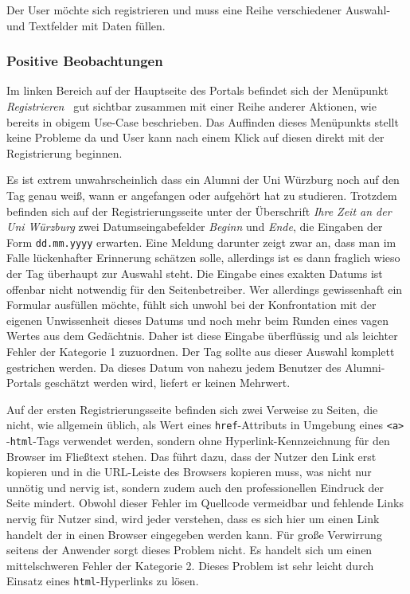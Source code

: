 \newpage
{}
Der User möchte sich registrieren und muss eine Reihe verschiedener Auswahl- und Textfelder mit Daten füllen.

\subsubsection*{Positive Beobachtungen} 
Im linken Bereich auf der Hauptseite des Portals befindet sich der Menüpunkt \emph{ Registrieren} ~gut sichtbar zusammen mit einer Reihe anderer Aktionen, wie bereits in obigem Use-Case beschrieben. Das Auffinden dieses Menüpunkts stellt keine Probleme da und User kann nach einem Klick auf diesen direkt mit der Registrierung
beginnen.




{ Es ist extrem unwahrscheinlich dass ein Alumni der Uni Würzburg noch auf den Tag genau weiß, wann er angefangen oder aufgehört hat zu studieren. Trotzdem befinden sich auf
der Registrierungsseite unter der Überschrift \emph{Ihre Zeit an der Uni Würzburg} zwei Datumseingabefelder \emph{Beginn} und \emph{Ende}, die Eingaben der Form \texttt{dd.mm.yyyy} erwarten.
}
{
Eine Meldung darunter zeigt zwar an, dass man im Falle lückenhafter Erinnerung schätzen solle, allerdings ist es dann fraglich wieso der Tag überhaupt zur Auswahl steht. Die Eingabe eines exakten Datums ist offenbar nicht notwendig für den Seitenbetreiber. Wer allerdings gewissenhaft ein Formular ausfüllen möchte, fühlt sich unwohl bei der Konfrontation mit der eigenen Unwissenheit dieses Datums und noch mehr beim Runden eines vagen Wertes aus dem Gedächtnis. Daher ist diese Eingabe überflüssig und als leichter Fehler der Kategorie 1 zuzuordnen.
}
{ Der Tag sollte aus dieser Auswahl komplett gestrichen werden. Da dieses Datum von nahezu jedem Benutzer des Alumni-Portals geschätzt werden wird, liefert er keinen Mehrwert.
} 
\label{prob:reg:wtfday}

{ Auf der ersten Registrierungsseite befinden sich zwei Verweise zu Seiten, die nicht, wie allgemein üblich, als Wert eines \texttt{href}-Attributs in Umgebung eines \texttt{\textless a\textgreater} -\texttt{html}-Tags verwendet werden, sondern ohne Hyperlink-Kennzeichnung für den Browser im Fließtext stehen. Das führt dazu, dass der Nutzer den Link erst kopieren und in die URL-Leiste des Browsers kopieren muss, was nicht nur unnötig und nervig ist, sondern zudem auch den professionellen Eindruck der Seite mindert.
}
{ Obwohl dieser Fehler im Quellcode vermeidbar und fehlende Links nervig für Nutzer sind, wird jeder verstehen, dass es sich hier um einen Link handelt der in einen Browser eingegeben werden kann. Für große Verwirrung seitens der Anwender sorgt dieses Problem nicht. Es handelt sich um einen mittelschweren Fehler der Kategorie 2.
}
{ Dieses Problem ist sehr leicht durch Einsatz eines \texttt{html}-Hyperlinks zu lösen.
} 
\label{prob:reg:hyperhyper}

